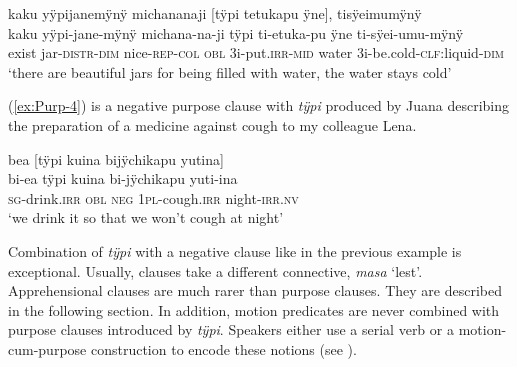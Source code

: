 \newpage
\ea\label{ex:purpose-3}
\begingl
\glpreamble kaku yÿpijanemÿnÿ michananaji \textup{[}tÿpi tetukapu ÿne\textup{]}, tisÿeimumÿnÿ\\
\gla kaku yÿpi-jane-mÿnÿ michana-na-ji tÿpi ti-etuka-pu ÿne ti-sÿei-umu-mÿnÿ\\
\glb exist jar-\textsc{distr}-\textsc{dim} nice-\textsc{rep}-\textsc{col} \textsc{obl} 3i-put.\textsc{irr}-\textsc{mid} water 3i-be.cold-\textsc{clf:}liquid-\textsc{dim}\\
\glft ‘there are beautiful jars for being filled with water, the water stays cold’
\endgl
\trailingcitation{[jxx-p120430l-2.594-596]}
\xe


(\ref{ex:Purp-4}) is a negative purpose clause with \textit{tÿpi} produced by Juana describing the preparation of a medicine against cough to my colleague Lena.

\ea\label{ex:Purp-4}
\begingl
\glpreamble bea \textup{[}tÿpi kuina bijÿchikapu yutina\textup{]}\\
\gla bi-ea tÿpi kuina bi-jÿchikapu yuti-ina\\
\textsc{sg}-drink.\textsc{irr} \textsc{obl} \textsc{neg} 1\textsc{pl}-cough.\textsc{irr} night-\textsc{irr.nv}\\
\glft ‘we drink it so that we won’t cough at night’
\endgl
\trailingcitation{[jxx-e191021e-2]}
\xe


Combination of \textit{tÿpi} with a negative clause like in the previous example is exceptional. Usually,  clauses take a different connective, \textit{masa} ‘lest’. Apprehensional clauses are much rarer than purpose clauses. They are described in the following section. In addition, motion predicates are never combined with purpose clauses introduced by \textit{tÿpi}. Speakers either use a serial verb or a motion-cum-purpose construction to encode these notions (see ). 


%
%
{}

